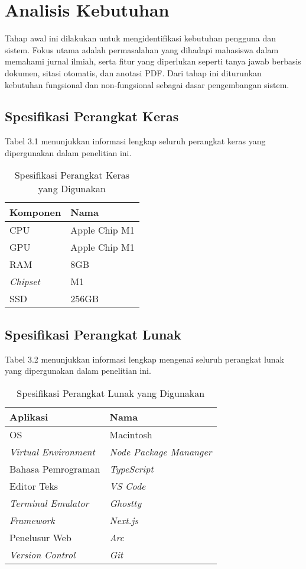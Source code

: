\section{Analisis Kebutuhan}

Tahap awal ini dilakukan untuk mengidentifikasi kebutuhan pengguna dan sistem. Fokus utama adalah permasalahan yang dihadapi mahasiswa dalam memahami jurnal ilmiah, serta fitur yang diperlukan seperti tanya jawab berbasis dokumen, sitasi otomatis, dan anotasi PDF. Dari tahap ini diturunkan kebutuhan fungsional dan non-fungsional sebagai dasar pengembangan sistem.

\subsection{Spesifikasi Perangkat Keras}

Tabel 3.1 menunjukkan informasi lengkap seluruh perangkat keras yang
dipergunakan dalam penelitian ini.

\begin{table}[H]
  \caption{Spesifikasi Perangkat Keras yang Digunakan}

  \centering{}%
  \begin{tabular}{|l|l|}
    \hline
    \textbf{Komponen} & \textbf{Nama}\tabularnewline
    \hline
    \hline
    CPU               & Apple Chip M1\tabularnewline
    \hline
    GPU               & Apple Chip M1\tabularnewline
    \hline
    RAM               & 8GB\tabularnewline
    \hline
    \emph{Chipset}    & M1\tabularnewline
    \hline
    SSD               & 256GB\tabularnewline
    \hline
  \end{tabular}
\end{table}


\subsection{Spesifikasi Perangkat Lunak}

Tabel 3.2 menunjukkan informasi lengkap mengenai seluruh perangkat
lunak yang dipergunakan dalam penelitian ini.

\begin{table}[H]
  \caption{Spesifikasi Perangkat Lunak yang Digunakan}

  \centering{}%
  \begin{tabular}{|l|l|}
    \hline
    \textbf{Aplikasi}          & \textbf{Nama}\tabularnewline
    \hline
    \hline
    OS                         & Macintosh\tabularnewline
    \hline
    \emph{Virtual Environment} & \emph{Node Package Mananger}\tabularnewline
    \hline
    Bahasa Pemrograman         & \emph{TypeScript}\tabularnewline
    \hline
    Editor Teks                & \emph{VS Code}\tabularnewline
    \hline
    \emph{Terminal Emulator}   & \emph{Ghostty}\tabularnewline
    \hline
    \emph{Framework}           & \emph{Next.js}\tabularnewline
    \hline
    Penelusur Web              & \emph{Arc}\tabularnewline
    \hline
    \emph{Version Control}     & \emph{Git}\tabularnewline
    \hline
  \end{tabular}
\end{table}
